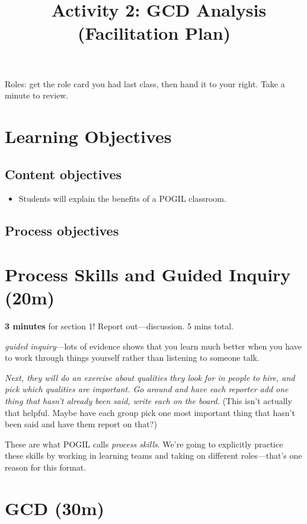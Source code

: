 \documentclass{tufte-handout}
\title{\thecourse\ Activity 2: GCD Analysis (Facilitation Plan)}
\date{}
\begin{document}
\maketitle

Roles: get the role card you had last class, then hand it to your
right.  Take a minute to review.

\section{Learning Objectives}

\subsection{Content objectives}

\begin{itemize}
\item Students will explain the benefits of a POGIL classroom.
\end{itemize}

\subsection{Process objectives}

\section{Process Skills and Guided Inquiry (20m)}

\textbf{3 minutes} for section 1!  Report out---discussion.  5 mins total.

\emph{guided inquiry}---lots of evidence shows that you learn much
better when you have to work through things yourself rather than
listening to someone talk.

\emph{Next, they will do an exercise about qualities they look for in
  people to hire, and pick which qualities are important.  Go around
  and have each reporter add one thing that hasn't already been said,
  write each on the board.} (This isn't actually that helpful.  Maybe
have each group pick one most important thing that hasn't been said
and have them report on that?)

These are what POGIL calls \emph{process skills}.  We're going to
explicitly practice these skills by working in learning teams and
taking on different roles---that's one reason for this format.

\section{GCD (30m)}
\end{document}

